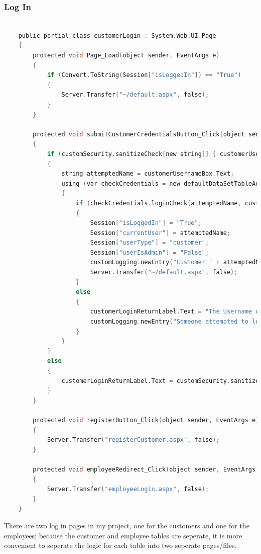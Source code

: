 ﻿\documentclass{article}
\begin{document}
    \subsubsection{Log In}
    \begin{lstlisting}[language=C]

    public partial class customerLogin : System.Web.UI.Page
    {
        protected void Page_Load(object sender, EventArgs e)
        {
            if (Convert.ToString(Session["isLoggedIn"]) == "True")
            {
                Server.Transfer("~/default.aspx", false);
            }
        }

        protected void submitCustomerCredentialsButton_Click(object sender, EventArgs e)
        {
            if (customSecurity.sanitizeCheck(new string[] { customerUsernameBox.Text, customerPasswordBox.Text }))
            {
                string attemptedName = customerUsernameBox.Text;
                using (var checkCredentials = new defaultDataSetTableAdapters.customersTableAdapter())
                {
                    if (checkCredentials.loginCheck(attemptedName, customSecurity.generateMD5(customerPasswordBox.Text)) != null)
                    {
                        Session["isLoggedIn"] = "True";
                        Session["currentUser"] = attemptedName;
                        Session["userType"] = "customer";
                        Session["userIsAdmin"] = "False";
                        customLogging.newEntry("Customer " + attemptedName + " logged in");
                        Server.Transfer("~/default.aspx", false);
                    }
                    else
                    {
                        customerLoginReturnLabel.Text = "The Username or Password is incorrect.";
                        customLogging.newEntry("Someone attempted to login as a customer with username '" + attemptedName + "' but the credentials were incorrect");
                    }
                }
            }
            else
            {
                customerLoginReturnLabel.Text = customSecurity.sanitizeErrorMessage;
            }
        }

        protected void registerButton_Click(object sender, EventArgs e)
        {
            Server.Transfer("registerCustomer.aspx", false);
        }

        protected void employeeRedirect_Click(object sender, EventArgs e)
        {
            Server.Transfer("employeeLogin.aspx", false);
        }
    }
    \end{lstlisting}
    There are two log in pages in my project, one for the customers and one for the employees; because the customer and employee tables are seperate, it is more convenient to seperate the logic for each table into two seperate pages/files.
\end{document}
